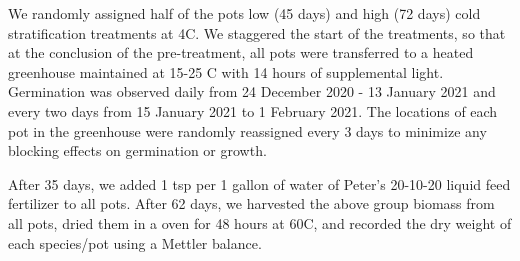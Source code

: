 \documentclass{article}\usepackage[]{graphicx}\usepackage[]{color}
\begin{document}
\noindent We randomly assigned half of the pots low (45 days) and high (72 days) cold stratification treatments at 4\degree C. We staggered the start of the treatments, so that at the conclusion of the pre-treatment, all pots were transferred to a heated greenhouse maintained at 15-25 \degree C with 14 hours of supplemental light. Germination was observed daily from 24 December 2020 - 13 January 2021 and every two days from 15 January 2021 to 1 February 2021. The locations of each pot in the greenhouse were randomly reassigned every 3 days to minimize any blocking effects on germination or growth.

\noident After 35 days, we added 1 tsp per 1 gallon of water of Peter’s 20-10-20 liquid feed fertilizer to all pots. After 62 days, we harvested the above group biomass from all pots, dried them in a oven for 48 hours at 60\degree C, and recorded the dry weight of each species/pot using a Mettler balance.\\
\end{document}
